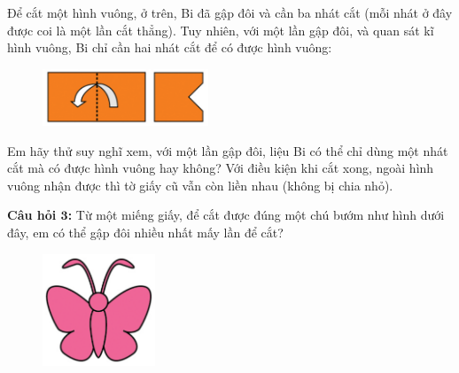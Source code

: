 \begin{multicols}{2}
	Để cắt một hình vuông, ở trên, Bi đã gập đôi và cần ba nhát cắt (mỗi nhát ở đây được coi là một lần cắt thẳng). Tuy nhiên, với một lần gập đôi, và quan sát kĩ hình vuông, Bi chỉ cần hai nhát cắt để có được hình vuông: 
	
	\columnbreak
	\begin{figure}[H]
		\captionsetup{labelformat=empty}
		\vspace*{20pt}
		\centering
		\captionsetup{justification=raggedleft}
		\includegraphics[width =0.44\textwidth]{cat-5}
		\vspace*{-5pt}
	\end{figure}
\end{multicols}
Em hãy thử suy nghĩ xem, với một lần gập đôi, liệu Bi có thể chỉ dùng một nhát cắt mà có  được hình vuông hay không? Với điều kiện khi cắt xong, ngoài hình vuông nhận được thì tờ giấy cũ vẫn còn liền nhau (không bị chia nhỏ).
\vskip 0.1cm
\begin{multicols}{2}
	\textbf{\color{toancuabi}Câu hỏi $\pmb{3}$:} Từ một miếng giấy, để cắt được đúng một chú bướm như hình dưới đây, em có thể gập đôi nhiều nhất mấy lần để cắt?
	
	\columnbreak
	\begin{figure}[H]
		\captionsetup{labelformat=empty}
		\vspace*{-5pt}
		\centering
		\captionsetup{justification=raggedleft}
		\includegraphics[width =0.3\textwidth]{cat-6}
	\end{figure}
\end{multicols}

